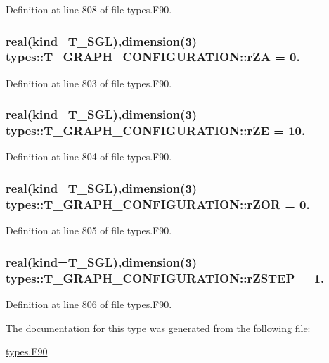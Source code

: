 Definition at line 808 of file types.F90.

\hypertarget{typetypes_1_1_t___g_r_a_p_h___c_o_n_f_i_g_u_r_a_t_i_o_n_ac5c4de6d335faf49fa4a32ab2e034d0c}{
\subsubsection[{rZA}]{\setlength{\rightskip}{0pt plus 5cm}real(kind={\bf T\_\-SGL}),dimension(3) {\bf types::T\_\-GRAPH\_\-CONFIGURATION::rZA} = 0.}}
\label{typetypes_1_1_t___g_r_a_p_h___c_o_n_f_i_g_u_r_a_t_i_o_n_ac5c4de6d335faf49fa4a32ab2e034d0c}


Definition at line 803 of file types.F90.

\hypertarget{typetypes_1_1_t___g_r_a_p_h___c_o_n_f_i_g_u_r_a_t_i_o_n_a3ea6eb3ab869dbe908a650dfb11bcf98}{
\subsubsection[{rZE}]{\setlength{\rightskip}{0pt plus 5cm}real(kind={\bf T\_\-SGL}),dimension(3) {\bf types::T\_\-GRAPH\_\-CONFIGURATION::rZE} = 10.}}
\label{typetypes_1_1_t___g_r_a_p_h___c_o_n_f_i_g_u_r_a_t_i_o_n_a3ea6eb3ab869dbe908a650dfb11bcf98}


Definition at line 804 of file types.F90.

\hypertarget{typetypes_1_1_t___g_r_a_p_h___c_o_n_f_i_g_u_r_a_t_i_o_n_a99655676433ac94e2a7a39424e226c7c}{
\subsubsection[{rZOR}]{\setlength{\rightskip}{0pt plus 5cm}real(kind={\bf T\_\-SGL}),dimension(3) {\bf types::T\_\-GRAPH\_\-CONFIGURATION::rZOR} = 0.}}
\label{typetypes_1_1_t___g_r_a_p_h___c_o_n_f_i_g_u_r_a_t_i_o_n_a99655676433ac94e2a7a39424e226c7c}


Definition at line 805 of file types.F90.

\hypertarget{typetypes_1_1_t___g_r_a_p_h___c_o_n_f_i_g_u_r_a_t_i_o_n_a69159f3b7eaa91e1f3268f1f09af6a2d}{
\subsubsection[{rZSTEP}]{\setlength{\rightskip}{0pt plus 5cm}real(kind={\bf T\_\-SGL}),dimension(3) {\bf types::T\_\-GRAPH\_\-CONFIGURATION::rZSTEP} = 1.}}
\label{typetypes_1_1_t___g_r_a_p_h___c_o_n_f_i_g_u_r_a_t_i_o_n_a69159f3b7eaa91e1f3268f1f09af6a2d}


Definition at line 806 of file types.F90.



The documentation for this type was generated from the following file:\begin{DoxyCompactItemize}
\item 
\hyperlink{types_8_f90}{types.F90}\end{DoxyCompactItemize}
